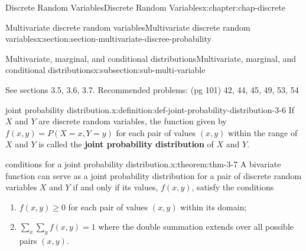\documentclass[oneside,10pt,]{book}
\newcommand{\terminology}[1]{\textbf{#1}}
\newcommand{\lt}{<}
\begin{document}
\begin{chapterptx}{Discrete Random Variables}{}{Discrete Random Variables}{}{}{x:chapter:chap-discrete}
\begin{sectionptx}{Multivariate discrete random variables}{}{Multivariate discrete random variables}{}{}{x:section:section-multivariate-discree-probability}
\begin{introduction}{}
\end{introduction}%
%
%
\typeout{************************************************}
\typeout{************************************************}
%
\begin{subsectionptx}{Multivariate, marginal, and conditional distributions}{}{Multivariate, marginal, and conditional distributions}{}{}{x:subsection:sub-multi-variable}
\begin{introduction}{}%
See sections 3.5, 3.6, 3.7. Recommended problems: (pg 101) 42, 44, 45, 49, 53, 54%
\end{introduction}%
\begin{definition}{joint probability distribution.}{x:definition:def-joint-probability-distribution-3-6}%
If \(\displaystyle X\) and \(\displaystyle Y\) are discrete random variables, the function given by \(\displaystyle f(x,y) = P(X=x,
Y=y)\) for each pair of values \(\displaystyle (x,y)\) within the range of \(\displaystyle X\) and \(\displaystyle Y\) is called the \terminology{joint probability distribution} of \(\displaystyle X\) and \(\displaystyle Y\).%
\end{definition}
\begin{theorem}{conditions for a joint probability distribution.}{}{x:theorem:thm-3-7}%
A bivariate function can serve as a joint probability distribution for a pair of discrete random variables \(\displaystyle X\) and \(\displaystyle Y\) if and only if its values, \(\displaystyle f(x,
y)\), satisfy the conditions%
\begin{enumerate}
\item{}\(\displaystyle f(x, y) \ge 0\) for each pair of values \(\displaystyle (x, y)\) within its domain;%
\item{}\(\displaystyle \sum_x\sum_y f(x, y) = 1\) where the double summation extends over all possible pairs \(\displaystyle (x,
y)\).%
\end{enumerate}
%
\end{theorem}
\end{subsectionptx}
\end{sectionptx}
\end{chapterptx}
\end{document}
